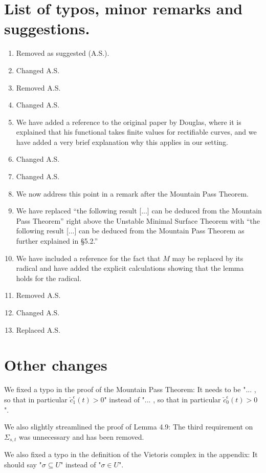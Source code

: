 \documentclass{article}
\begin{document}
	\section{List of typos, minor remarks and suggestions.}
	\begin{enumerate}
		\item Removed as suggested (A.S.).
		\item Changed A.S.
		\item Removed A.S.
		\item Changed A.S.
		\item We have added a reference to the original paper by Douglas, where it is explained that his functional takes finite values for rectifiable curves, and we have added a very brief explanation why this applies in our setting.
		\item Changed A.S.
		\item Changed A.S.
		\item We now address this point in a remark after the Mountain Pass Theorem.
		\item We have replaced ``the following result [...] can be deduced from the Mountain Pass Theorem'' right above the Unstable Minimal Surface Theorem with ``the following result [...] can be deduced from the Mountain Pass Theorem as further explained in \S 5.2.''
		\item We have included a reference for the fact that $M$ may be replaced by its radical and have added the explicit calculations showing that the lemma holds for the radical.
		\item Removed A.S.
		\item Changed A.S.
		\item Replaced A.S.
	\end{enumerate}
	
	\section{Other changes}
	We fixed a typo in the proof of the Mountain Pass Theorem: It needs to be "... , so that in particular $\check c_{1}^{\epsilon}(t) > 0$" instead of "... , so that in particular $\check c_{0}^{\epsilon}(t) > 0$".
	
	We also slightly streamlined the proof of Lemma 4.9: The third requirement on $\Sigma_{s,t}$ was unnecessary and has been removed.
	
	We also fixed a typo in the definition of the Vietoris complex in the appendix: It should say "$\sigma \subseteq U$" instead of "$\sigma \in U$".
\end{document}
